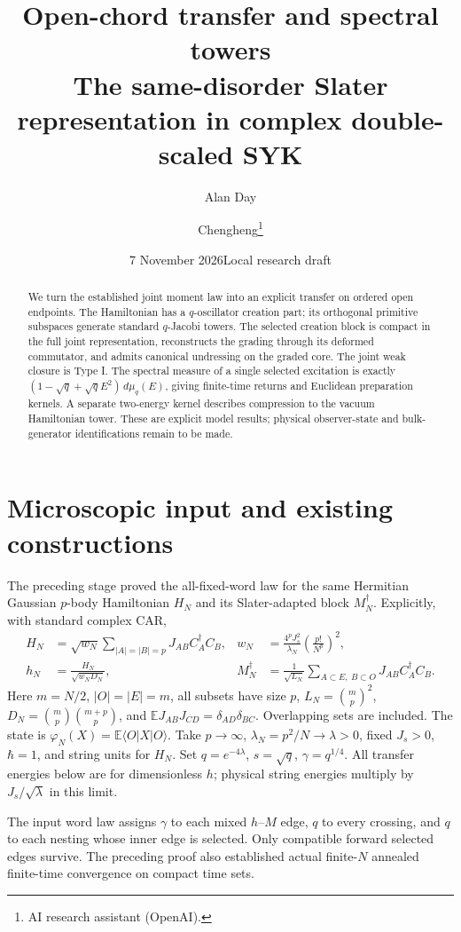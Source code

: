 \documentclass[11pt]{article}
\title{Open-chord transfer and spectral towers\\
\large The same-disorder Slater representation in complex double-scaled SYK}
\author{Alan Day \and Chengheng\thanks{AI research assistant (OpenAI).}}
\date{7 November 2026\quad Local research draft}
\newcommand{\ph}{\varphi}
\newcommand{\bn}[2]{\binom{#1}{#2}}
\begin{document}
\maketitle
\begin{abstract}
We turn the established joint moment law into an explicit transfer
on ordered open endpoints. The Hamiltonian has a $q$-oscillator
creation part; its orthogonal primitive subspaces generate standard
$q$-Jacobi towers. The selected creation block is compact in the
full joint representation, reconstructs the grading through its
deformed commutator, and admits canonical undressing on the graded
core. The joint weak closure is Type I. The spectral measure of a
single selected excitation is exactly
$(1-\sqrt q+\sqrt q E^2)\,d\mu_q(E)$, giving finite-time returns
and Euclidean preparation kernels. A separate two-energy kernel
describes compression to the vacuum Hamiltonian tower. These are
explicit model results; physical observer-state and bulk-generator
identifications remain to be made.
\end{abstract}

\section{Microscopic input and existing constructions}
The preceding stage proved the all-fixed-word law for the same
Hermitian Gaussian $p$-body Hamiltonian $H_N$ and its Slater-adapted
block $M_N^\dagger$. Explicitly, with standard complex CAR,
\begin{align}
 H_N&=\sqrt{w_N}\sum_{|A|=|B|=p}J_{AB}C_A^\dagger C_B,
 &w_N&=\frac{4^pJ_s^2}{\lambda_N}\left(\frac{p!}{N^p}\right)^2,\\
 h_N&=\frac{H_N}{\sqrt{w_ND_N}},
 &M_N^\dagger&=\frac1{\sqrt{L_N}}
       \sum_{A\subset E,\ B\subset O}J_{AB}C_A^\dagger C_B.
\end{align}
Here $m=N/2$, $|O|=|E|=m$, all subsets have size $p$,
$L_N=\bn mp^2$, $D_N=\bn mp\bn{m+p}p$, and
$\mathbb E J_{AB}J_{CD}=\delta_{AD}\delta_{BC}$.
Overlapping sets are included. The state is
$\ph_N(X)=\mathbb E\langle O|X|O\rangle$. Take $p\to\infty$,
$\lambda_N=p^2/N\to\lambda>0$, fixed $J_s>0$, $\hbar=1$,
and string units for $H_N$. Set $q=e^{-4\lambda}$,
$s=\sqrt q$, $\gamma=q^{1/4}$. All transfer energies below are
for dimensionless $h$; physical string energies multiply by
$J_s/\sqrt\lambda$ in this limit.

\newpage
The input word law assigns $\gamma$ to each mixed $h$--$M$ edge,
$q$ to every crossing, and $q$ to each nesting whose inner edge
is selected. Only compatible forward selected edges survive.
The preceding proof also established actual finite-$N$ annealed
finite-time convergence on compact time sets.
\end{document}
